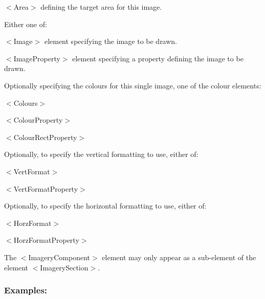 \begin{DoxyItemize}
\item {\ttfamily $<$Area$>$} defining the target area for this image.


\item Either one of\+: 
\begin{DoxyItemize}
\item {\ttfamily $<$Image$>$} element specifying the image to be drawn. 
\item {\ttfamily $<$Image\+Property$>$} element specifying a property defining the image to be drawn. 
\end{DoxyItemize}


\item Optionally specifying the colours for this single image, one of the colour elements\+: 
\begin{DoxyItemize}
\item {\ttfamily $<$Colours$>$} 
\item {\ttfamily $<$Colour\+Property$>$} 
\item {\ttfamily $<$Colour\+Rect\+Property$>$} 
\end{DoxyItemize}


\item Optionally, to specify the vertical formatting to use, either of\+: 
\begin{DoxyItemize}
\item {\ttfamily $<$Vert\+Format$>$} 
\item {\ttfamily $<$Vert\+Format\+Property$>$} 
\end{DoxyItemize}


\item Optionally, to specify the horizontal formatting to use, either of\+: 
\begin{DoxyItemize}
\item {\ttfamily $<$Horz\+Format$>$} 
\item {\ttfamily $<$Horz\+Format\+Property$>$} 
\end{DoxyItemize}


\item The {\ttfamily $<$Imagery\+Component$>$} element may only appear as a sub-\/element of the element {\ttfamily $<$Imagery\+Section$>$}. 
\end{DoxyItemize}\hypertarget{fal_element_ref_fal_elem_ref_sec_20_4}{}\subsubsection{Examples\+:}\label{fal_element_ref_fal_elem_ref_sec_20_4}

